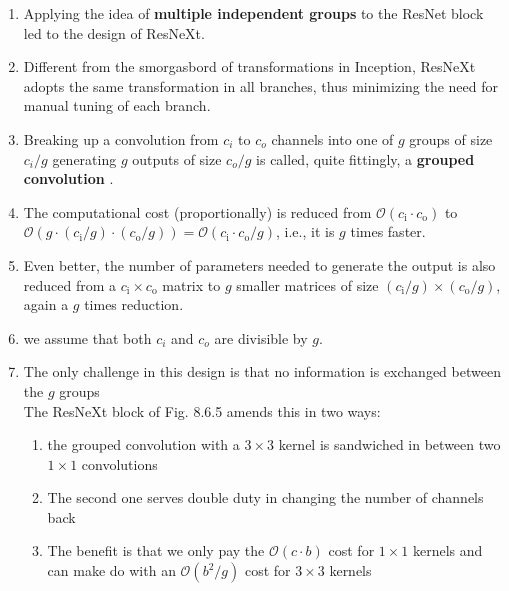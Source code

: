 \begin{enumerate}
    \item Applying the idea of \textbf{multiple independent groups} to the ResNet block led to the design of ResNeXt. 
    
    \item Different from the smorgasbord of transformations in Inception, ResNeXt adopts the same transformation in all branches, thus minimizing the need for manual tuning of each branch.

    \item Breaking up a convolution from $c_i$ to $c_o$ channels into one of $g$ groups of size $c_i/g$ generating $g$ outputs of size $c_o/g$ is called, quite fittingly, a \textbf{grouped convolution} .

    \item The computational cost (proportionally) is reduced from $\mathcal{O}(c_\textrm{i} \cdot c_\textrm{o})$ to $\mathcal{O}(g \cdot (c_\textrm{i}/g) \cdot (c_\textrm{o}/g)) = \mathcal{O}(c_\textrm{i} \cdot c_\textrm{o} / g)$, i.e., it is $g$ times faster.

    \item Even better, the number of parameters needed to generate the output is also reduced from a $c_\textrm{i} \times c_\textrm{o}$ matrix to $g$ smaller matrices of size $(c_\textrm{i}/g) \times (c_\textrm{o}/g)$, again a $g$ times reduction.

    \item we assume that both $c_i$ and $c_o$ are divisible by $g$.

    \item The only challenge in this design is that no information is exchanged between the $g$ groups\\
    The ResNeXt block of Fig. 8.6.5 amends this in two ways:
    \begin{enumerate}
        \item the grouped convolution with a $3 \times 3$ kernel is sandwiched in between two $1 \times 1$ convolutions

        \item The second one serves double duty in changing the number of channels back

        \item The benefit is that we only pay the $\mathcal{O}(c \cdot b)$ cost for $1 \times 1$ kernels and can make do with an $\mathcal{O}(b^2 / g)$ cost for $3 \times 3$ kernels

    \end{enumerate}
\end{enumerate}









